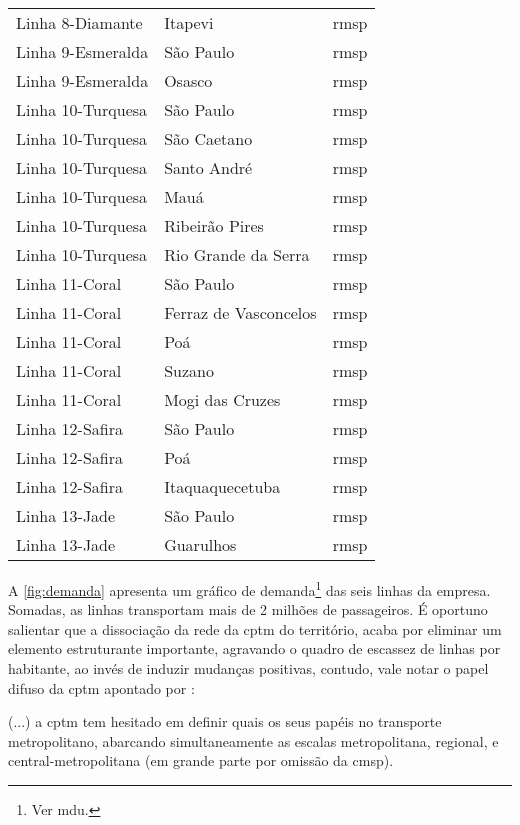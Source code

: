 \documentclass[11pt,fleqn]{book} %
\begin{document}
\begin{center}
\begin{longtable}{|l|l|l|}
		Linha 8-Diamante & Itapevi & \gls{rmsp} \\
		Linha 9-Esmeralda & São Paulo & \gls{rmsp} \\
		Linha 9-Esmeralda & Osasco & \gls{rmsp} \\
		Linha 10-Turquesa & São Paulo & \gls{rmsp} \\
		Linha 10-Turquesa & São Caetano & \gls{rmsp} \\
		Linha 10-Turquesa & Santo André & \gls{rmsp} \\
		Linha 10-Turquesa & Mauá & \gls{rmsp} \\
		Linha 10-Turquesa & Ribeirão Pires & \gls{rmsp} \\
		Linha 10-Turquesa & Rio Grande da Serra & \gls{rmsp} \\
		Linha 11-Coral & São Paulo & \gls{rmsp} \\
		Linha 11-Coral & Ferraz de Vasconcelos & \gls{rmsp} \\
		Linha 11-Coral & Poá & \gls{rmsp} \\
		Linha 11-Coral & Suzano & \gls{rmsp} \\
		Linha 11-Coral & Mogi das Cruzes & \gls{rmsp} \\
		Linha 12-Safira & São Paulo & \gls{rmsp} \\
		Linha 12-Safira & Poá & \gls{rmsp} \\
		Linha 12-Safira & Itaquaquecetuba & \gls{rmsp} \\
		Linha 13-Jade & São Paulo & \gls{rmsp} \\
		Linha 13-Jade & Guarulhos & \gls{rmsp} \\
		\end{longtable}
\end{center}	

A \autoref{fig:demanda} apresenta um gráfico de demanda\footnote{Ver \gls{mdu}.} das seis linhas da empresa. Somadas, as linhas transportam mais de 2 milhões de passageiros. É oportuno salientar que a dissociação da rede da \gls{cptm} do território, acaba por eliminar um elemento estruturante importante, agravando o quadro de escassez de linhas por habitante, ao invés de induzir mudanças positivas, contudo, vale notar o papel difuso da \gls{cptm} apontado por \cite[p. 122]{Isoda}: 

\begin{citacao}
	(...) a \gls{cptm} tem hesitado em definir quais os seus papéis no transporte metropolitano, abarcando simultaneamente as escalas metropolitana, regional, e central-metropolitana (em grande parte por omissão da \gls{cmsp}).
\end{citacao}
\end{document}

